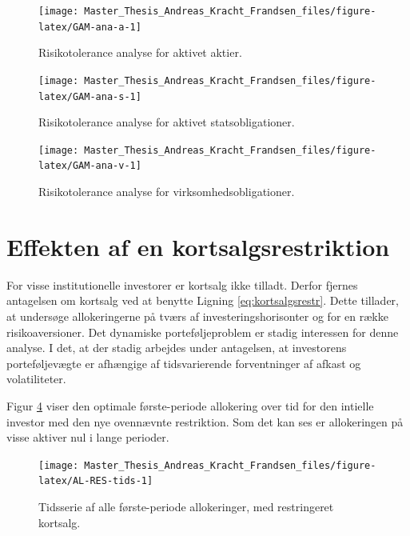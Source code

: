 \documentclass[
  a4paper,
  oneside]{memoir}
\begin{document}
\begin{figure}[H]

{\centering \texttt{[image: Master\_Thesis\_Andreas\_Kracht\_Frandsen\_files/figure-latex/GAM-ana-a-1]} 

}

\caption{Risikotolerance analyse for aktivet aktier.}\label{fig:GAM-ana-a}
\end{figure}

\begin{figure}[H]

{\centering \texttt{[image: Master\_Thesis\_Andreas\_Kracht\_Frandsen\_files/figure-latex/GAM-ana-s-1]} 

}

\caption{Risikotolerance analyse for aktivet statsobligationer.}\label{fig:GAM-ana-s}
\end{figure}

\begin{figure}[H]

{\centering \texttt{[image: Master\_Thesis\_Andreas\_Kracht\_Frandsen\_files/figure-latex/GAM-ana-v-1]} 

}

\caption{Risikotolerance analyse for virksomhedsobligationer.}\label{fig:GAM-ana-v}
\end{figure}

\hypertarget{effekten-af-en-kortsalgsrestriktion}{%
\section{Effekten af en kortsalgsrestriktion}\label{effekten-af-en-kortsalgsrestriktion}}

For visse institutionelle investorer er kortsalg ikke tilladt. Derfor fjernes antagelsen om kortsalg ved at benytte Ligning \eqref{eq:kortsalgsrestr}. Dette tillader, at undersøge allokeringerne på tværs af investeringshorisonter og for en række risikoaversioner. Det dynamiske porteføljeproblem er stadig interessen for denne analyse. I det, at der stadig arbejdes under antagelsen, at investorens porteføljevægte er afhængige af tidsvarierende forventninger af afkast og volatiliteter.

Figur \ref{fig:AL-RES-tids} viser den optimale første-periode allokering over tid for den intielle investor med den nye ovennævnte restriktion. Som det kan ses er allokeringen på visse aktiver nul i lange perioder.

\begin{figure}[H]

{\centering \texttt{[image: Master\_Thesis\_Andreas\_Kracht\_Frandsen\_files/figure-latex/AL-RES-tids-1]} 

}

\caption{Tidsserie af alle første-periode allokeringer, med restringeret kortsalg.}\label{fig:AL-RES-tids}
\end{figure}
\end{document}
